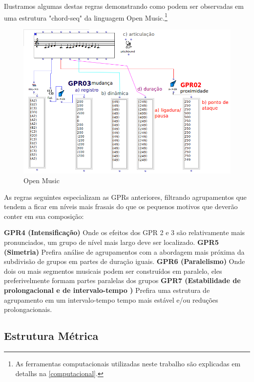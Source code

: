 \documentclass[
	12pt,				%
	openright,			%
	twoside,			%
	a4paper,			%
	english,			%
	french,				%
	spanish,			%
	brazil				%
	]{abntex2}
\begin{document}
\pagebreak
Ilustramos algumas destas regras demonstrando como podem ser observadas em uma estrutura "chord-seq" da linguagem Open Music.\footnote{As ferramentas computacionais utilizadas neste trabalho são explicadas em detalhs na \autoref{computacional}. }


\begin{figure}[htb]
	\caption{\label{fig_grafico}Open Music}
	\begin{center}
	    \includegraphics[scale=0.6]{mikro/OM_gttm_GPR02-03.png}
	\end{center}
\end{figure}


As regras seguintes especializam as GPRs anteriores, filtrando agrupamentos que tendem a ficar em níveis mais frasais do que os pequenos motivos que deverão conter em sua composição:

\begin{citacao}
\textbf{GPR4 (Intensificação)} Onde os efeitos dos GPR 2 e 3 são relativamente mais pronunciados, um grupo de nível mais largo deve ser localizado. \textbf{GPR5 (Simetria)} Prefira análise de agrupamentos com a abordagem mais próxima da subdivisão de grupos em partes de duração iguais. \textbf{GPR6 (Paralelismo)} Onde dois ou mais segmentos musicais podem ser construídos em paralelo, eles preferivelmente formam partes paralelas dos grupos \textbf{GPR7 (Estabilidade de prolongacional e de intervalo-tempo )} Prefira uma estrutura de agrupamento em um intervalo-tempo tempo mais estável e/ou reduções prolongacionais.
\cite[ pg.46-52]{lerdahl1983generative}
\end{citacao}


\subsection{Estrutura Métrica}
\end{document}
